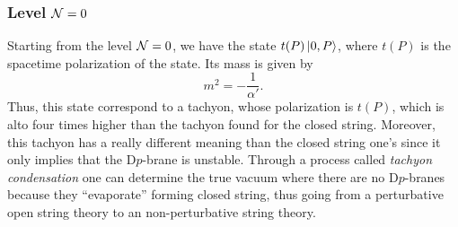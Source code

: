 \subsubsection{Level \texorpdfstring{$\mathcal{N} = 0$}{N = 0}}
Starting from the level $\mathcal{N} = 0$, we have the state $t(P)\ket{0,P}$, where $t(P)$ is the spacetime polarization of the state. Its mass is given by 
\begin{equation}
    m^2 = -\frac{1}{\alpha'}.
\end{equation}
Thus, this state correspond to a tachyon, whose polarization is $t(P)$, which is alto four times higher than the tachyon found for the closed string. Moreover, this tachyon has a really different meaning than the closed string one's since it only implies that the D$p$-brane is unstable. Through a process called \emph{tachyon condensation} one can determine the true vacuum where there are no D$p$-branes because they ``evaporate'' forming closed string, thus going from a perturbative open string theory to an non-perturbative string theory. 

